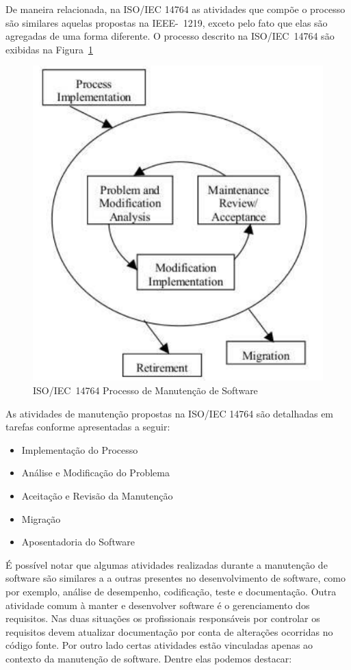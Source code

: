 De maneira relacionada, na ISO/IEC 14764 as atividades que compõe o processo são
similares aquelas propostas na IEEE-~1219, exceto pelo fato que elas são
agregadas de uma forma diferente. O processo descrito na ISO/IEC~14764 são
exibidas na Figura~\ref{fig:ieee-14764-processo-manutencao}

\begin{figure}[htpb] \centering
	\includegraphics[width=0.7\linewidth]
{chapter-manutencao-software-visao-geral/img/ieee-14764-processo-manutencao.pdf}
	\caption{ISO/IEC~14764 Processo de Manutenção de Software}
\label{fig:ieee-14764-processo-manutencao} \end{figure}

As atividades de manutenção propostas na ISO/IEC 14764 são detalhadas em tarefas
conforme apresentadas a seguir:

\begin{itemize} \item Implementação do Processo \item Análise e Modificação do
		Problema \item Aceitação e Revisão da Manutenção \item Migração \item
		Aposentadoria do Software	\end{itemize}

É possível notar que algumas atividades realizadas durante a manutenção de
software são similares a a outras presentes no desenvolvimento de software, como
por exemplo, análise de desempenho, codificação, teste e documentação. Outra
atividade comum à manter e desenvolver software é o gerenciamento dos
requisitos. Nas duas situações os profissionais responsáveis por controlar os
requisitos devem atualizar documentação  por conta de alterações ocorridas no
código fonte. Por outro lado certas atividades estão vinculadas apenas ao
contexto da manutenção de software. Dentre elas podemos destacar:

